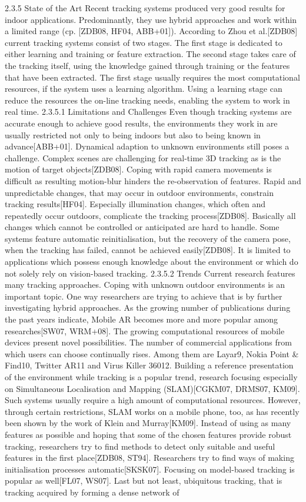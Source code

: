 2.3.5 State of the Art Recent tracking systems produced very good results for indoor applications. Predominantly, they use hybrid approaches and work within a limited range (cp. [ZDB08, HF04, ABB+01]). According to Zhou et al.[ZDB08] current tracking systems consist of two stages. The first stage is dedicated to either learning and training or feature extraction. The second stage takes care of the tracking itself, using the knowledge gained through training or the features that have been extracted. The first stage usually requires the most computational resources, if the system uses a learning algorithm. Using a learning stage can reduce the resources the on-line tracking needs, enabling the system to work in real time. 2.3.5.1 Limitations and Challenges Even though tracking systems are accurate enough to achieve good results, the environments they work in are usually restricted not only to being indoors but also to being known in advance[ABB+01]. Dynamical adaption to unknown environments still poses a challenge. Complex scenes are challenging for real-time 3D tracking as is the motion of target objects[ZDB08]. Coping with rapid camera movements is difficult as resulting motion-blur hinders the re-observation of features. Rapid and unpredictable changes, that may occur in outdoor environments, constrain tracking results[HF04]. Especially illumination changes, which often and repeatedly occur outdoors, complicate the tracking process[ZDB08]. Basically all changes which cannot be controlled or anticipated are hard to handle. Some systems feature automatic reinitialisation, but the recovery of the camera pose, when the tracking has failed, cannot be achieved easily[ZDB08]. It is limited to applications which possess enough knowledge about the environment or which do not solely rely on vision-based tracking. 2.3.5.2 Trends Current research features many tracking approaches. Coping with unknown outdoor environments is an important topic. One way researchers are trying to achieve that is by further investigating hybrid approaches. As the growing number of publications during the past years indicate, Mobile AR becomes more and more popular among researches[SW07, WRM+08]. The growing computational resources of mobile devices present novel possibilities. The number of commercial applications from which users can choose continually rises. Among them are Layar9, Nokia Point & Find10, Twitter AR11 and Virus Killer 36012. Building a reference presentation of the environment while tracking is a popular trend, research focusing especially on Simultaneous Localisation and Mapping (SLAM)[CGKM07, DRMS07, KM09]. Such systems usually require a high amount of computational resources. However, through certain restrictions, SLAM works on a mobile phone, too, as has recently been shown by the work of Klein and Murray[KM09]. Instead of using as many features as possible and hoping that some of the chosen features provide robust tracking, researchers try to find methods to detect only suitable and useful features in the first place[ZDB08, ST94]. Researchers try to find ways of making initialisation processes automatic[SKSK07]. Focusing on model-based tracking is popular as well[FL07, WS07]. Last but not least, ubiquitous tracking, that is tracking acquired by forming a dense network of 